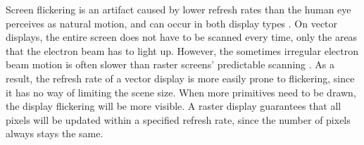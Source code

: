 Screen flickering is an artifact caused by lower refresh rates than the human eye perceives as natural motion, and can occur in both display types \cite{flicker}.
On vector displays, the entire screen does not have to be scanned every time, only the areas that the electron beam has to light up.
However, the sometimes irregular electron beam motion is often slower than raster screens' predictable scanning \cite{vecvsras}.
As a result, the refresh rate of a vector display is more easily prone to flickering, since it has no way of limiting the scene size.
When more primitives need to be drawn, the display flickering will be more visible.
A raster display guarantees that all pixels will be updated within a specified refresh rate, since the number of pixels always stays the same.

